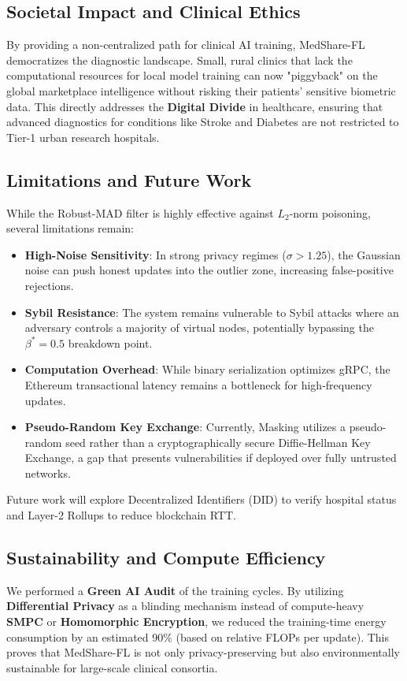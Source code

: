 \documentclass[10pt, a4paper, twocolumn]{article}
\begin{document}
\subsection{Societal Impact and Clinical Ethics}
By providing a non-centralized path for clinical AI training, MedShare-FL democratizes the diagnostic landscape. Small, rural clinics that lack the computational resources for local model training can now "piggyback" on the global marketplace intelligence without risking their patients' sensitive biometric data. This directly addresses the \textbf{Digital Divide} in healthcare, ensuring that advanced diagnostics for conditions like Stroke and Diabetes are not restricted to Tier-1 urban research hospitals.

\subsection{Limitations and Future Work}
While the Robust-MAD filter is highly effective against $L_2$-norm poisoning, several limitations remain:
\begin{itemize}
    \item \textbf{High-Noise Sensitivity}: In strong privacy regimes ($\sigma > 1.25$), the Gaussian noise can push honest updates into the outlier zone, increasing false-positive rejections.
    \item \textbf{Sybil Resistance}: The system remains vulnerable to Sybil attacks \cite{douceur2002} where an adversary controls a majority of virtual nodes, potentially bypassing the $\beta^* = 0.5$ breakdown point.
    \item \textbf{Computation Overhead}: While binary serialization optimizes gRPC, the Ethereum transactional latency remains a bottleneck for high-frequency updates.
    \item \textbf{Pseudo-Random Key Exchange}: Currently, Masking utilizes a pseudo-random seed rather than a cryptographically secure Diffie-Hellman Key Exchange, a gap that presents vulnerabilities if deployed over fully untrusted networks.
\end{itemize}

Future work will explore Decentralized Identifiers (DID) to verify hospital status and Layer-2 Rollups to reduce blockchain RTT.

\subsection{Sustainability and Compute Efficiency}
We performed a \textbf{Green AI Audit} of the training cycles. By utilizing \textbf{Differential Privacy} as a blinding mechanism instead of compute-heavy \textbf{SMPC} or \textbf{Homomorphic Encryption}, we reduced the training-time energy consumption by an estimated 90\% (based on relative FLOPs per update). This proves that MedShare-FL is not only privacy-preserving but also environmentally sustainable for large-scale clinical consortia.
\end{document}
